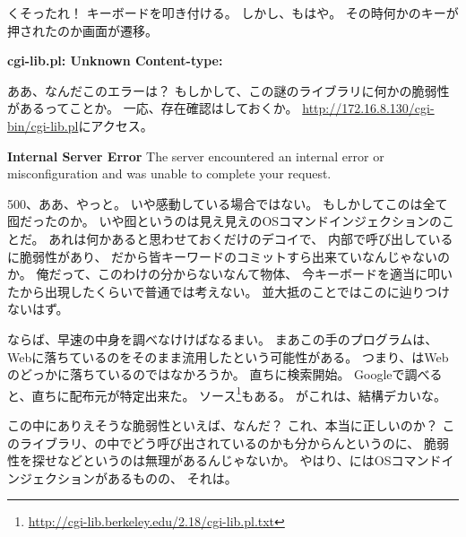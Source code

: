 くそったれ！
キーボードを叩き付ける。
しかし、もはや。
その時何かのキーが押されたのか画面が遷移。

\begin{screen}
\textbf{cgi-lib.pl: Unknown Content-type: }
\end{screen}

ああ、なんだこのエラーは？
もしかして、この謎のライブラリに何かの脆弱性があるってことか。
一応、存在確認はしておくか。
\url{http://172.16.8.130/cgi-bin/cgi-lib.pl}にアクセス。

\begin{itembox}[c]{\textbf{Internal Server Error}}
The server encountered an internal error or misconfiguration and 
was unable to complete your request.
\end{itembox}

500、ああ、やっと。
いや感動している場合ではない。
もしかしてこのは全て囮だったのか。
いや囮というのは見え見えのOSコマンドインジェクションのことだ。
あれは何かあると思わせておくだけのデコイで、
内部で呼び出しているに脆弱性があり、
だから皆キーワードのコミットすら出来ていなんじゃないのか。
俺だって、このわけの分からないなんて物体、
今キーボードを適当に叩いたから出現したくらいで普通では考えない。
並大抵のことではこのに辿りつけないはず。

ならば、早速の中身を調べなけけばなるまい。
まあこの手のプログラムは、
Webに落ちているのをそのまま流用したという可能性がある。
つまり、はWebのどっかに落ちているのではなかろうか。
直ちに検索開始。
Googleで調べると、直ちに配布元が特定出来た。
ソース\footnote{\url{http://cgi-lib.berkeley.edu/2.18/cgi-lib.pl.txt}}もある。
がこれは、結構デカいな。

この中にありえそうな脆弱性といえば、なんだ？
これ、本当に正しいのか？
このライブラリ、の中でどう呼び出されているのかも分からんというのに、
脆弱性を探せなどというのは無理があるんじゃないか。
やはり、にはOSコマンドインジェクションがあるものの、
それは。


